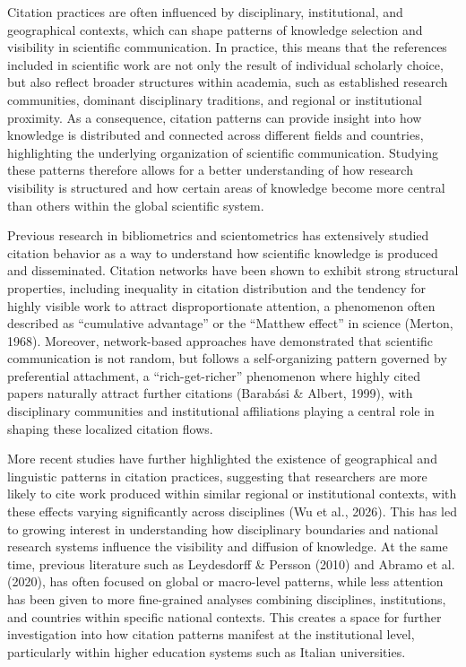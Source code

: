 \documentclass[year=2026]{cup-journal}
\begin{document}
Citation practices are often influenced by disciplinary, institutional, and geographical contexts, which can shape patterns of knowledge selection and visibility in scientific communication. In practice, this means that the references included in scientific work are not only the result of individual scholarly choice, but also reflect broader structures within academia, such as established research communities, dominant disciplinary traditions, and regional or institutional proximity. As a consequence, citation patterns can provide insight into how knowledge is distributed and connected across different fields and countries, highlighting the underlying organization of scientific communication. Studying these patterns therefore allows for a better understanding of how research visibility is structured and how certain areas of knowledge become more central than others within the global scientific system.

Previous research in bibliometrics and scientometrics has extensively studied citation behavior as a way to understand how scientific knowledge is produced and disseminated. Citation networks have been shown to exhibit strong structural properties, including inequality in citation distribution and the tendency for highly visible work to attract disproportionate attention, a phenomenon often described as “cumulative advantage” or the “Matthew effect” in science (Merton, 1968). Moreover, network-based approaches have demonstrated that scientific communication is not random, but follows a self-organizing pattern governed by preferential attachment, a “rich-get-richer” phenomenon where highly cited papers naturally attract further citations (Barabási \& Albert, 1999), with disciplinary communities and institutional affiliations playing a central role in shaping these localized citation flows.

More recent studies have further highlighted the existence of geographical and linguistic patterns in citation practices, suggesting that researchers are more likely to cite work produced within similar regional or institutional contexts, with these effects varying significantly across disciplines (Wu et al., 2026). This has led to growing interest in understanding how disciplinary boundaries and national research systems influence the visibility and diffusion of knowledge. At the same time, previous literature such as Leydesdorff \& Persson (2010) and Abramo et al. (2020), has often focused on global or macro-level patterns, while less attention has been given to more fine-grained analyses combining disciplines, institutions, and countries within specific national contexts. This creates a space for further investigation into how citation patterns manifest at the institutional level, particularly within higher education systems such as Italian universities.
\end{document}
